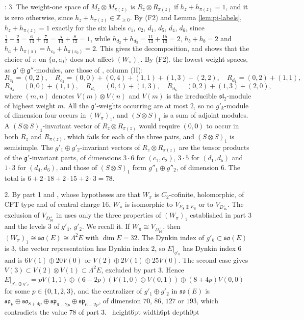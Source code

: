 \documentclass[leqno]{article}
\newcommand{\Z}{\ensuremath{\mathbb{Z}}}
\renewcommand{\geq}{\ensuremath{\geqslant}}
\newcommand{\qed}{\hfill \vrule height6pt  width6pt depth0pt}
\newcommand{\ot}{\otimes}
\newenvironment{proof}[1][]{\noindent {\it Proof #1} : }{\hbox{~}\qed
\smallskip
}
\numberwithin{equation}{section}
\begin{document}
\begin{proof}
3. The weight-one space of $M_z \ot M_{\pi(z)}$ is $R_z \ot R_{\pi(z)}$ if $h_z+h_{\pi(z)} = 1$, and it is zero otherwise, since $h_z+h_{\pi(z)} \in \Z_{\geq 0}$. By (F2) and Lemma \ref{lem:pi-labels}, $h_z+h_{\pi(z)} = 1$ exactly for the six labels $c_1$, $c_2$, $d_1$, $d_5$, $d_4$, $d_6$, since $\frac13+\frac23 = \frac{6}{13}+\frac{7}{13} = \frac{5}{13}+\frac{8}{13} = 1$, while $h_{d_2}+h_{d_3} = \frac{11}{13}+\frac{15}{13} = 2$, $h_b+h_b = 2$ and $h_a+h_{\pi(a)} = h_{c_0}+h_{\pi(c_0)} = 2$. This gives the decomposition, and shows that the choice of $\pi$ on $\{a,c_0\}$ does not affect $(W_\pi)_1$. By (F2), the lowest weight spaces, as $\mathfrak g' \oplus \mathfrak g''$-modules, are those of \cite[Table 2]{Arh26}, column (II):
\[
R_{c_1} = (0,2),\quad R_{c_2} = (0,0)+(0,4)+(1,1)+(1,3)+(2,2),\quad R_{d_1} = (0,2)+(1,1),
\]
\[
R_{d_4} = (0,0)+(1,1),\quad R_{d_5} = (0,4)+(1,3),\quad R_{d_6} = (0,2)+(1,3)+(2,0),
\]
where $(m,n)$ denotes $V(m) \ot V(n)$ and $V(m)$ is the irreducible $\mathfrak{sl}_2$-module of highest weight $m$. All the $\mathfrak g'$-weights occurring are at most $2$, so no $g'_k$-module of dimension four occurs in $(W_\pi)_1$, and $(S \ot S)_1$ is a sum of adjoint modules. A $(S \ot S)_1$-invariant vector of $R_z \ot R_{\pi(z)}$ would require $(0,0)$ to occur in both $R_z$ and $R_{\pi(z)}$, which fails for each of the three pairs, and $(S \ot S)_1$ is semisimple. The $g'_1 \oplus g'_2$-invariant vectors of $R_z \ot R_{\pi(z)}$ are the tensor products of the $\mathfrak g'$-invariant parts, of dimensions $3 \cdot 6$ for $(c_1,c_2)$, $3 \cdot 5$ for $(d_1,d_5)$ and $1 \cdot 3$ for $(d_4,d_6)$, and those of $(S \ot S)_1$ form $g''_1 \oplus g''_2$, of dimension $6$. The total is $6+2 \cdot 18+2 \cdot 15+2 \cdot 3 = 78$.

2. By part 1 and \cite[Theorem 2 p.~2]{DoM04b}, whose hypotheses are that $W_\pi$ is $C_2$-cofinite, holomorphic, of CFT type and of central charge $16$, $W_\pi$ is isomorphic to $V_{E_8 \oplus E_8}$ or to $V_{D_{16}^+}$. The exclusion of $V_{D_{16}^+}$ in \cite[proof of Proposition 7.12]{ArhII} uses only the three properties of $(W_\pi)_1$ established in part 3 and the levels $3$ of $g'_1$, $g'_2$. We recall it. If $W_\pi \cong V_{D_{16}^+}$, then $(W_\pi)_1 \cong \mathfrak{so}(E) \cong \Lambda^2E$ with $\dim E = 32$. The Dynkin index of $g'_k \subset \mathfrak{so}(E)$ is $3$, the vector representation has Dynkin index $2$, so $E|_{g'_k}$ has Dynkin index $6$ and is $6V(1) \oplus 20V(0)$ or $V(2) \oplus 2V(1) \oplus 25V(0)$. The second case gives $V(3) \subset V(2) \ot V(1) \subset \Lambda^2E$, excluded by part 3. Hence $E|_{g'_1 \oplus g'_2} = pV(1,1) \oplus (6-2p)(V(1,0) \oplus V(0,1)) \oplus (8+4p)V(0,0)$ for some $p \in \{0,1,2,3\}$, and the centralizer of $g'_1 \oplus g'_2$ in $\mathfrak{so}(E)$ is $\mathfrak{so}_p \oplus \mathfrak{so}_{8+4p} \oplus \mathfrak{sp}_{6-2p} \oplus \mathfrak{sp}_{6-2p}$, of dimension $70$, $86$, $127$ or $193$, which contradicts the value $78$ of part 3.
\end{proof}
\end{document}
